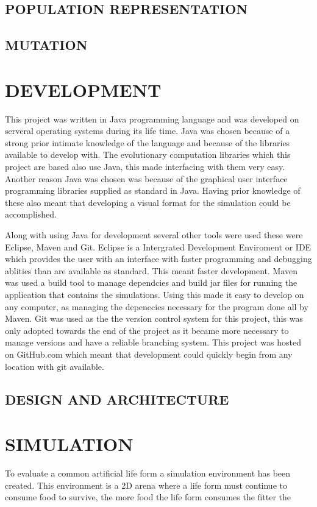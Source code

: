 \documentclass[10pt,twocolumn]{article}
\begin{document}
\subsection{POPULATION REPRESENTATION}

\subsection{MUTATION}
\section{DEVELOPMENT}

This project was written in Java programming language and was developed on serveral operating systems during its life time. Java was chosen because of
a strong prior intimate knowledge of the language and because of the libraries available to develop with. The evolutionary computation libraries which
this project are based also use Java, this made interfacing with them very easy. Another reason Java was chosen was because of the graphical user interface 
programming libraries supplied as standard in Java. Having prior knowledge of these also meant that developing a visual format for the simulation could be 
accomplished. 

Along with using Java for development several other tools were used these were Eclipse, Maven and Git. Eclipse is a Intergrated Development Enviroment or IDE which
provides the user with an interface with faster programming and debugging ablities than are available as standard. This meant faster development. Maven was used a build tool to manage dependcies and build jar files for running the application that contains the simulations. Using this made it easy to develop on any computer, as managing the depenecies necessary for the program done all by Maven. Git was used as the the version control system for this project, this was only adopted towards the end of the project as it became more necessary to manage versions and have a reliable branching system. This project was hosted on GitHub.com which 
meant that development could quickly begin from any location with git available. 

\subsection{DESIGN AND ARCHITECTURE}


\section{SIMULATION}
To evaluate a common artificial life form a simulation environment has been created.
This environment is a 2D arena where a life form must continue to consume food to survive, the more food the life form consumes the fitter the  
\end{document}
